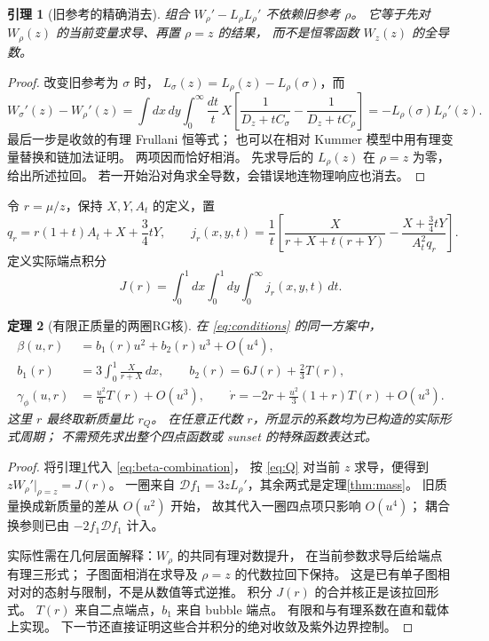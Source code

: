 \documentclass[11pt,a4paper]{ctexart}
\theoremstyle{cnplain}
\newtheorem{theorem}{定理}[section]
\newtheorem{lemma}[theorem]{引理}
\theoremstyle{remark}\newtheorem{remark}[theorem]{注}
\newcommand{\gphi}{\gamma_\phi}
\newcommand{\dd}{\mathcal D}
\begin{document}
\begin{lemma}[旧参考的精确消去]\label{lem:reference}
组合 $W_\rho'-L_\rho L_\rho'$ 不依赖旧参考 $\rho$。
它等于先对 $W_\rho(z)$ 的当前变量求导、再置 $\rho=z$ 的结果，
而不是恒零函数 $W_z(z)$ 的全导数。
\end{lemma}
\begin{proof}
改变旧参考为 $\sigma$ 时，
$L_\sigma(z)=L_\rho(z)-L_\rho(\sigma)$，而
\[
 W_\sigma'(z)-W_\rho'(z)
 =\int dx\,dy\int_0^\infty\frac{dt}{t}\,
 X\left[\frac1{D_z+tC_\sigma}-\frac1{D_z+tC_\rho}\right]
 =-L_\rho(\sigma)L_\rho'(z).
\]
最后一步是收敛的有理 Frullani 恒等式；
也可以在相对 Kummer 模型中用有理变量替换和链加法证明。
两项因而恰好相消。
先求导后的 $L_\rho(z)$ 在 $\rho=z$ 为零，给出所述拉回。
若一开始沿对角求全导数，会错误地连物理响应也消去。
\end{proof}

令 $r=\mu/z$，保持 $X,Y,A_t$ 的定义，置
\[
 q_r=r(1+t)A_t+X+\frac34tY,\qquad
 j_r(x,y,t)=\frac1t
 \left[
  \frac{X}{r+X+t(r+Y)}
       -\frac{X+\frac34tY}{A_t^2q_r}
 \right].
\]
定义实际端点积分
\begin{equation}\label{eq:J}
 J(r)=\int_0^1dx\int_0^1dy\int_0^\infty j_r(x,y,t)\,dt.
\end{equation}

\begin{theorem}[有限正质量的两圈RG核]\label{thm:beta}
在 \eqref{eq:conditions} 的同一方案中，
\begin{align}
 \beta(u,r)&=b_1(r)u^2+b_2(r)u^3+O(u^4),\label{eq:beta}\\
 b_1(r)&=3\int_0^1\frac{X}{r+X}\,dx,\qquad
 b_2(r)=6J(r)+\frac23T(r),\label{eq:b12}\\
 \gphi(u,r)&=\frac{u^2}{6}T(r)+O(u^3),\qquad
 \dot r=-2r+\frac{u^2}{3}(1+r)T(r)+O(u^3).
                                                        \label{eq:vector}
\end{align}
这里 $r$ 最终取新质量比 $r_Q$。
在任意正代数 $r$，所显示的系数均为已构造的实际形式周期；
不需预先求出整个四点函数或 sunset 的特殊函数表达式。
\end{theorem}
\begin{proof}
将引理\ref{lem:reference}代入 \eqref{eq:beta-combination}，
按 \eqref{eq:Q} 对当前 $z$ 求导，便得到
$zW_\rho'|_{\rho=z}=J(r)$。
一圈来自 $\dd f_1=3zL_\rho'$，其余两式是定理\ref{thm:mass}。
旧质量换成新质量的差从 $O(u^2)$ 开始，
故其代入一圈四点项只影响 $O(u^4)$；
耦合换参则已由 $-2f_1\dd f_1$ 计入。

实际性需在几何层面解释：$W_\rho$ 的共同有理对数提升，
在当前参数求导后给端点有理三形式；
子图面相消在求导及 $\rho=z$ 的代数拉回下保持。
这是已有单子图相对对的态射与限制，不是从数值等式逆推。
积分 $J(r)$ 的合并核正是该拉回形式。
$T(r)$ 来自二点端点，$b_1$ 来自 bubble 端点。
有限和与有理系数在直和载体上实现。
下一节还直接证明这些合并积分的绝对收敛及紫外边界控制。
\end{proof}
\end{document}

